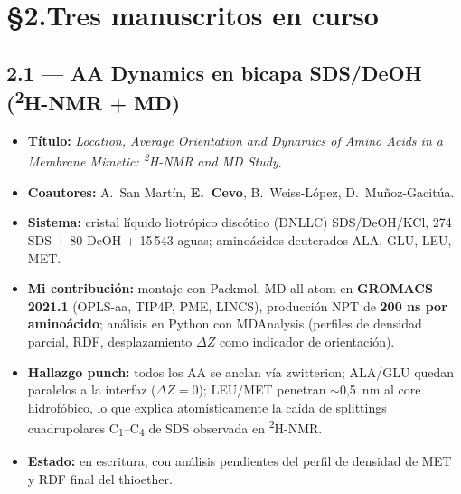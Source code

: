 \documentclass[11pt,a4paper]{article}
\begin{document}
\section*{\S2.\quad Tres manuscritos en curso}

\subsection*{2.1 --- AA Dynamics en bicapa SDS/DeOH (\textsuperscript{2}H-NMR + MD)}
\begin{itemize}
    \item \textbf{Título:} \textit{Location, Average Orientation and Dynamics of Amino Acids in a Membrane Mimetic: \textsuperscript{2}H-NMR and MD Study}.
    \item \textbf{Coautores:} A.\ San Martín, \textbf{E.\ Cevo}, B.\ Weiss-López, D.\ Muñoz-Gacitúa.
    \item \textbf{Sistema:} cristal líquido liotrópico discótico (DNLLC) SDS/DeOH/KCl, 274 SDS + 80 DeOH + 15\,543 aguas; aminoácidos deuterados ALA, GLU, LEU, MET.
    \item \textbf{Mi contribución:} montaje con Packmol, MD all-atom en \textbf{GROMACS 2021.1} (OPLS-aa, TIP4P, PME, LINCS), producción NPT de \textbf{200 ns por aminoácido}; análisis en Python con MDAnalysis (perfiles de densidad parcial, RDF, desplazamiento $\Delta Z$ como indicador de orientación).
    \item \textbf{Hallazgo punch:} todos los AA se anclan vía zwitterion; ALA/GLU quedan paralelos a la interfaz ($\Delta Z=0$); LEU/MET penetran $\sim$0{,}5~nm al core hidrofóbico, lo que explica atomísticamente la caída de splittings cuadrupolares C\textsubscript{1}--C\textsubscript{4} de SDS observada en \textsuperscript{2}H-NMR.
    \item \textbf{Estado:} en escritura, con análisis pendientes del perfil de densidad de MET y RDF final del thioether.
\end{itemize}
\end{document}
